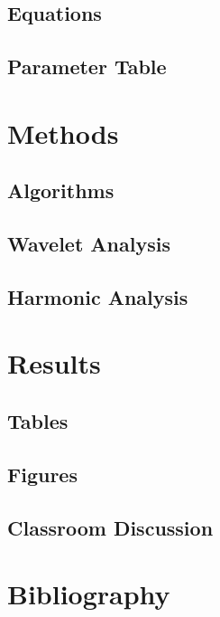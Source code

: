 \subsection{Equations}

\subsection{Parameter Table}

\section{Methods}

\subsection{Algorithms}

\subsection{Wavelet Analysis}

\subsection{Harmonic Analysis}


\section{Results}

\subsection{Tables}

\subsection{Figures}

\subsection{Classroom Discussion}

\section{Bibliography}
